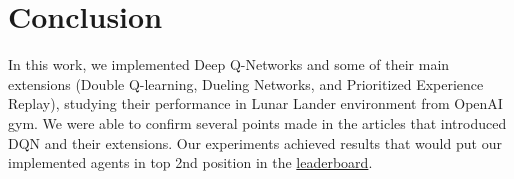 \documentclass{article}
\begin{document}
    \section{Conclusion}
    \label{sec:conclusion}

    In this work, we implemented Deep Q-Networks and some of their main extensions (Double Q-learning, Dueling Networks, and Prioritized Experience Replay), studying their performance in Lunar Lander environment from OpenAI gym.
    We were able to confirm several points made in the articles that introduced DQN and their extensions.
    Our experiments achieved results that would put our implemented agents in top 2nd position in the \href{https://github.com/openai/gym/wiki/Leaderboard#lunarlander-v2}{leaderboard}.

\printbibliography
\end{document}

